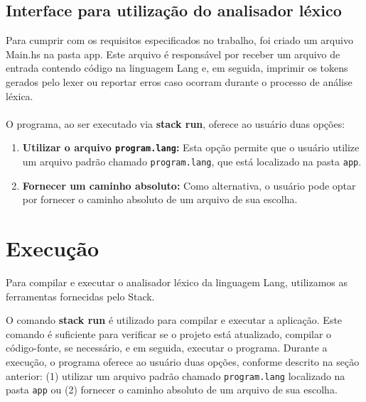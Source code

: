 \documentclass{article}
\begin{document}
\subsection{Interface para utilização do analisador léxico}
Para cumprir com os requisitos especificados no trabalho, foi criado um arquivo Main.hs na pasta app. Este arquivo é responsável por receber um arquivo de entrada contendo código na linguagem Lang e, em seguida, imprimir os tokens gerados pelo lexer ou reportar erros caso ocorram durante o processo de análise léxica.
\\\\
O programa, ao ser executado via \textbf{stack run}, oferece ao usuário duas opções:

\begin{enumerate}
    \item \textbf{Utilizar o arquivo \texttt{program.lang}:} Esta opção permite que o usuário utilize um arquivo padrão chamado \texttt{program.lang}, que está localizado na pasta \texttt{app}.
    \item \textbf{Fornecer um caminho absoluto:} Como alternativa, o usuário pode optar por fornecer o caminho absoluto de um arquivo de sua escolha.
\end{enumerate}

\section{Execução}
Para compilar e executar o analisador léxico da linguagem Lang, utilizamos as ferramentas fornecidas pelo Stack.

O comando \textbf{stack run} é utilizado para compilar e executar a aplicação. Este comando é suficiente para verificar se o projeto está atualizado, compilar o código-fonte, se necessário, e em seguida, executar o programa. Durante a execução, o programa oferece ao usuário duas opções, conforme descrito na seção anterior: (1) utilizar um arquivo padrão chamado \texttt{program.lang} localizado na pasta \texttt{app} ou (2) fornecer o caminho absoluto de um arquivo de sua escolha.

\newpage
\end{document}
